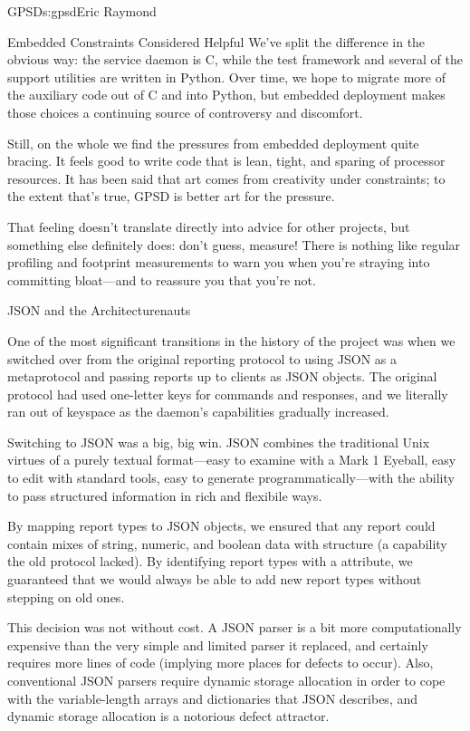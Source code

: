 \begin{aosachapter}{GPSD}{s:gpsd}{Eric Raymond}
\begin{aosasect1}{Embedded Constraints Considered Helpful}
We've split the difference in the obvious way: the  service
daemon is C, while the test framework and several of the support
utilities are written in Python. Over time, we hope to migrate more of
the auxiliary code out of C and into Python, but embedded deployment
makes those choices a continuing source of controversy and discomfort.

Still, on the whole we find the pressures from embedded deployment
quite bracing.  It feels good to write code that is lean, tight, and
sparing of processor resources.  It has been said that art comes from
creativity under constraints; to the extent that's true, GPSD is
better art for the pressure.

That feeling doesn't translate directly into advice for other
projects, but something else definitely does: don't guess, measure!
There is nothing like regular profiling and footprint measurements to
warn you when you're straying into committing bloat---and to reassure
you that you're not.

\end{aosasect1}

\begin{aosasect1}{JSON and the Architecturenauts}

One of the most significant transitions in the history of the project
was when we switched over from the original reporting protocol to
using JSON as a metaprotocol and passing reports up to clients as JSON
objects. The original protocol had used one-letter keys for commands
and responses, and we literally ran out of keyspace as the daemon's
capabilities gradually increased.

Switching to JSON was a big, big win. JSON combines the traditional
Unix virtues of a purely textual format---easy to examine with a Mark
1 Eyeball, easy to edit with standard tools, easy to generate
programmatically---with the ability to pass structured information in
rich and flexibile ways.

By mapping report types to JSON objects, we ensured that any report
could contain mixes of string, numeric, and boolean data with
structure (a capability the old protocol lacked).  By identifying
report types with a  attribute, we guaranteed that we
would always be able to add new report types without stepping on old
ones.

This decision was not without cost.  A JSON parser is a bit more
computationally expensive than the very simple and limited parser it
replaced, and certainly requires more lines of code (implying more
places for defects to occur). Also, conventional JSON parsers require
dynamic storage allocation in order to cope with the variable-length
arrays and dictionaries that JSON describes, and dynamic storage
allocation is a notorious defect attractor.


\end{aosasect1}
\end{aosachapter}
